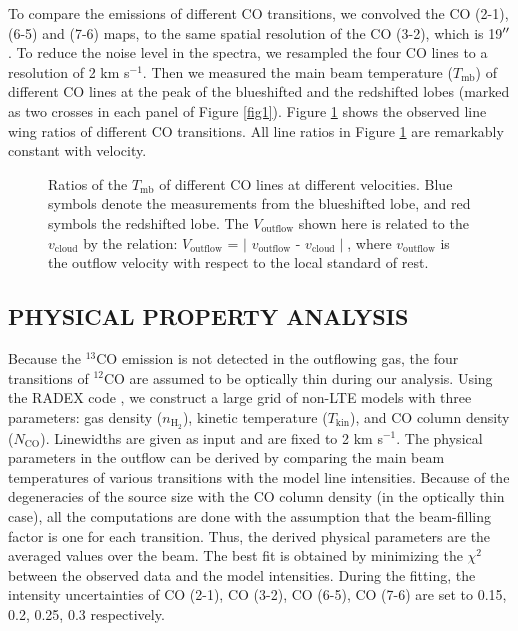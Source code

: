 To compare the emissions of different CO transitions, we convolved the CO (2-1), (6-5) and (7-6) maps, to the same spatial resolution of the CO (3-2), which is 19${\mbox{$^{\prime\prime}$}}$. To reduce the noise level in the spectra, we resampled the four CO lines to a resolution of 2 km s$^{-1}$. Then we measured the main beam temperature ($T_{\mathrm{mb}}$) of different CO lines at the peak of the blueshifted and the redshifted lobes (marked as two crosses in each panel of Figure \ref{fig1}). Figure \ref{fig2} shows the observed line wing ratios of different CO transitions.  All line ratios in Figure \ref{fig2} are remarkably constant with velocity.

\begin{figure}[tbp]
\caption{Ratios of the $T_{\mathrm{mb}}$ of different CO lines at different velocities. Blue symbols denote the measurements from the blueshifted lobe, and red symbols the redshifted lobe. The $V_{\mathrm{outflow}}$ shown here is related to the $v_{\mathrm{cloud}}$ by the relation: $V_{\mathrm{outflow}}$ = $\mid$ $v_{\mathrm{outflow}}$ - $v_{\mathrm{cloud}}\mid$, where $v_{\mathrm{outflow}}$ is the outflow velocity with respect to the local standard of rest. \label{fig2}}
\end{figure}

\subsection{PHYSICAL PROPERTY ANALYSIS}
Because the $^{13}$CO emission is not detected in the outflowing gas, the four transitions of $^{12}$CO are assumed to be optically thin during our analysis. Using the RADEX code \citep{2007A&A...468..627V}, we construct a large grid of non-LTE models with three parameters: gas density ($n_{\mathrm{H}_2}$), kinetic temperature ($T_{\mathrm{kin}}$), and CO column density ($N_{\mathrm{CO}}$). Linewidths are given as input and are fixed to 2 km s$^{-1}$. The physical parameters in the outflow can be derived by comparing the main beam temperatures of various transitions with the model line intensities. Because of the degeneracies of the source size with the CO column density (in the optically thin case), all the computations are done with the assumption that the beam-filling factor is one for each transition. Thus, the derived physical parameters are the averaged values over the beam. The best fit is obtained by minimizing the $\chi^2$ between the observed data and the model intensities. During the fitting, the intensity uncertainties of CO (2-1), CO (3-2), CO (6-5), CO (7-6) are set to 0.15, 0.2, 0.25, 0.3 respectively.


